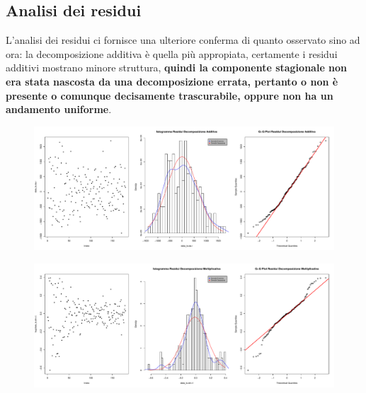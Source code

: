 \documentclass[11pt,a4paper]{article}
\begin{document}
\subsection{Analisi dei residui}
L'analisi dei residui ci fornisce una ulteriore conferma di quanto osservato
sino ad ora: la decomposizione additiva \`e quella pi\`u appropiata, certamente
i residui additivi mostrano minore struttura, \textbf{quindi la componente
stagionale non era stata nascosta da una decomposizione errata, pertanto o non
\`e presente o comunque decisamente trascurabile, oppure non ha un andamento
uniforme}.
\begin{figure}[H]
	\vspace{-0.3cm}
	\hspace{-2.7cm}
	\includegraphics[scale=0.55]{imgs/additive_residuals.pdf}
\end{figure}
\begin{figure}[H]
	\vspace{-0.5cm}
	\hspace{-2.7cm}
	\includegraphics[scale=0.55]{imgs/multiplicative_residuals.pdf}
\end{figure}
\end{document}
